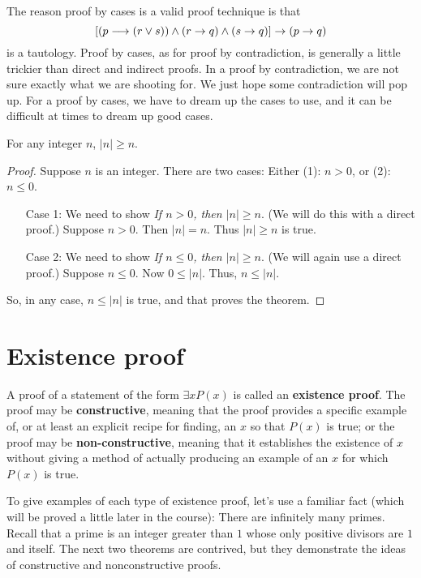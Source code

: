 The reason proof by cases is a valid proof technique is that
\[[(p\longrightarrow(r\lor s))\land(r\to q)\land(s\to q)]\to (p\to q)\]
is a tautology. Proof by cases, as for proof by contradiction, is generally
a little trickier than direct and indirect proofs. In a proof by contradiction,
we are not sure exactly what we are shooting for. We just hope some contradiction
will pop up. For a proof by cases, we have to dream up the cases to use, and it
can be difficult at times to dream up good cases.

\begin{thm}
  For any integer $n$, $|n|\geq n$.
\end{thm}
\begin{proof}
 Suppose $n$ is an integer. There are two cases:%
 Either  (1): $n>0$, or (2): $n\leq 0$.
\begin{enumerate}
  \item[Case 1:] We need to show {\itshape If $n>0$, then $|n|\geq n$}.
   (We will do this with a direct proof.) Suppose $n>0$. Then $|n|=n$. Thus
   $|n|\geq n$ is true.
   
   \item[Case 2:] We need to show  {\itshape If $n\leq 0$, then $|n|\geq n$}.
   (We will again use a direct proof.) Suppose $n\leq 0$. Now $0\leq |n|$. Thus,
   $n\leq |n|$.
\end{enumerate}
 
 So, in any case, $n\leq |n|$ is true, and that proves the theorem.
\end{proof}

\section{Existence proof}
A proof of a statement of the form $\exists x P(x)$ is called an {\bfseries existence proof}.
The proof may be {\bfseries constructive}, meaning that the proof provides a specific example of,
or at least an explicit
recipe  for finding,  an $x$ so that $P(x)$ is true; or the proof may be 
{\bfseries  non-constructive},
meaning  that it establishes the existence of $x$ without giving a method of actually producing
an example of an $x$ for which $P(x)$ is true. 

To give examples of each type of existence proof, let's use a familiar fact (which will be proved
a little later in the course): There are infinitely many primes.  Recall that a prime is an integer
greater than $1$ whose only positive divisors are $1$ and itself.
The next two theorems are 
contrived, but they demonstrate the ideas of constructive and nonconstructive proofs.

